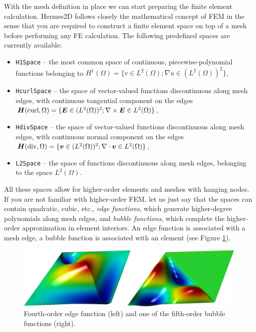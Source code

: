 \documentclass[11pt]{article}
\newcommand{\bfv}{\mbox{\boldmath $v$}}
\newcommand{\bfE}{\mbox{\boldmath $E$}}
\newcommand{\bfH}{\mbox{\boldmath $H$}}
\def\Hcurl{{\bfH({\rm curl})}}
\def\Hdiv{{\bfH({\rm div})}}
\begin{document}
With the mesh definition in place we can start preparing the finite element calculation.
Hermes2D follows closely the mathematical concept of FEM in the
sense that you are required to construct a finite element space on top of a mesh
before performing any FE calculation. The following predefined spaces are currently
available:
\begin{itemize}
  \item {\tt H1Space} --  the most common space of continuous,
        piecewise-polynomial functions belonging to $H^1(\Omega) = \{ v \in L^2(\Omega);
        \nabla u \in (L^2(\Omega))^2 \}$,
  \item {\tt HcurlSpace} -- \index{Space!$\Hcurl$} the space of vector-valued functions discontinuous along mesh edges, with
        continuous tangential component on the edges $\bfH(\mbox{curl},\Omega) = \{ \bfE \in (L^2(\Omega))^2;
        \nabla \times \bfE \in L^2(\Omega)\}$,
  \item {\tt HdivSpace} -- \index{Space!$\Hdiv$} the space of vector-valued functions discontinuous along mesh edges, with
        continuous normal component on the edges $\bfH(\mbox{div},\Omega) = \{ \bfv \in (L^2(\Omega))^2;
        \nabla \cdot \bfv \in L^2(\Omega)\}$,
  \item {\tt L2Space} --  the space of functions discontinuous along mesh edges,
        belonging to the space $L^2(\Omega)$.
\end{itemize}

  
All these spaces allow for higher-order elements and meshes with hanging nodes.
If you are not familiar with higher-order FEM, let us just say that the spaces can contain
quadratic, cubic, etc., {\em edge functions}, which generate higher-degree
polynomials along mesh edges, and {\em bubble functions}, which complete the higher-order
approximation in element interiors. An edge function is associated with a mesh edge,
a bubble function is associated with an element
(see Figure \ref{fig:basisfn}).

\begin{figure}[!ht]
  \centering\bigskip
  \includegraphics[width=\textwidth]{img/basisfn.jpg}
  \caption{\protect\centering Fourth-order edge function (left) and\break
  one of the fifth-order bubble functions (right).}
  \label{fig:basisfn}
\end{figure}
\end{document}
